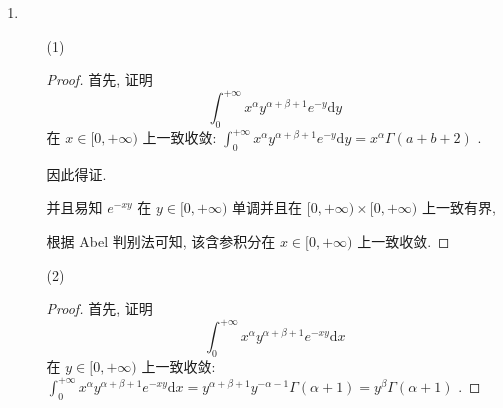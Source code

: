 \documentclass{article}
\begin{document}
\begin{enumerate}
\begin{proof}
        因此由引理可以推出 \begin{equation}
            \begin{aligned}
                f^{'}(r)
                &=\frac{1}{r}\int_{0}^{\pi}\left(\frac{r^2-1}{1+r^2-2r\cos x}+1\right)\mathrm{d}x \\
                &=\frac{1}{r}\left(\frac{\pi(r^2-1)}{\sqrt{(1+r^2)^2-4r^2}}+\pi\right) \\
            \end{aligned}
            \nonumber
        \end{equation}
        当 $|r|<1$ 时, $f^{'}(r)=0$ , 即 $f(r)$ 在 $(-1,1)$ 内为常数, 由 $f(0)=0$ 可知 $f(r)\equiv 0$ , 即 \begin{equation}
            \int_{0}^{\pi}\ln(1-2r\cos x+r^2)\mathrm{d}x=0
            \nonumber
        \end{equation} \par
        得证.
    \end{proof}
    \item \begin{enumerate}
        \item[(1)] \begin{proof}
            首先, 证明 \begin{equation}
                \int_{0}^{+\infty}x^{\alpha}y^{\alpha+\beta+1}e^{-y}\mathrm{d}y
                \nonumber
            \end{equation}
            在 $x\in[0,+\infty)$ 上一致收敛: $\int_{0}^{+\infty}x^{\alpha}y^{\alpha+\beta+1}e^{-y}\mathrm{d}y=x^{\alpha}\Gamma(a+b+2)$ . \par
            因此得证. \par
            并且易知 $e^{-xy}$ 在 $y\in[0,+\infty)$ 单调并且在 $[0,+\infty)\times[0,+\infty)$ 上一致有界, \par
            根据 Abel 判别法可知, 该含参积分在 $x\in[0,+\infty)$ 上一致收敛.
        \end{proof}
        \item[(2)] \begin{proof}
            首先, 证明 \begin{equation}
                \int_{0}^{+\infty}x^{\alpha}y^{\alpha+\beta+1}e^{-xy}\mathrm{d}x
                \nonumber
            \end{equation}
            在 $y\in[0,+\infty)$ 上一致收敛: $\int_{0}^{+\infty}x^{\alpha}y^{\alpha+\beta+1}e^{-xy}\mathrm{d}x=y^{\alpha+\beta+1}y^{-\alpha-1}\Gamma(\alpha+1)=y^{\beta}\Gamma(\alpha+1)$ . \par

\end{proof}
\end{enumerate}
\end{enumerate}
\end{document}
